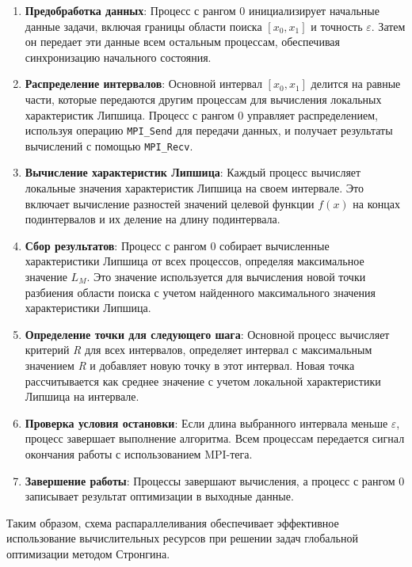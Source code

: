 \documentclass[a4paper,12pt]{article}
\begin{document}
\begin{enumerate}
\item \textbf{Предобработка данных}: Процесс с рангом $0$ инициализирует начальные данные задачи, включая границы области поиска $[x_0, x_1]$ и точность $\varepsilon$. Затем он передает эти данные всем остальным процессам, обеспечивая синхронизацию начального состояния.
\item \textbf{Распределение интервалов}: Основной интервал $[x_0, x_1]$ делится на равные части, которые передаются другим процессам для вычисления локальных характеристик Липшица. Процесс с рангом $0$ управляет распределением, используя операцию \texttt{MPI\_Send} для передачи данных, и получает результаты вычислений с помощью \texttt{MPI\_Recv}.

\item \textbf{Вычисление характеристик Липшица}: Каждый процесс вычисляет локальные значения характеристик Липшица на своем интервале. Это включает вычисление разностей значений целевой функции $f(x)$ на концах подинтервалов и их деление на длину подинтервала.

\item \textbf{Сбор результатов}: Процесс с рангом $0$ собирает вычисленные характеристики Липшица от всех процессов, определяя максимальное значение $L_M$. Это значение используется для вычисления новой точки разбиения области поиска с учетом найденного максимального значения характеристики Липшица.

\item \textbf{Определение точки для следующего шага}: Основной процесс вычисляет критерий \textit{R} для всех интервалов, определяет интервал с максимальным значением \textit{R} и добавляет новую точку в этот интервал. Новая точка рассчитывается как среднее значение с учетом локальной характеристики Липшица на интервале.

\item \textbf{Проверка условия остановки}: Если длина выбранного интервала меньше $\varepsilon$, процесс завершает выполнение алгоритма. Всем процессам передается сигнал окончания работы с использованием MPI-тега.

\item \textbf{Завершение работы}: Процессы завершают вычисления, а процесс с рангом $0$ записывает результат оптимизации в выходные данные.
\end{enumerate}

\hspace*{1.25em}Таким образом, схема распараллеливания обеспечивает эффективное использование вычислительных ресурсов при решении задач глобальной оптимизации методом Стронгина.
\end{document}

